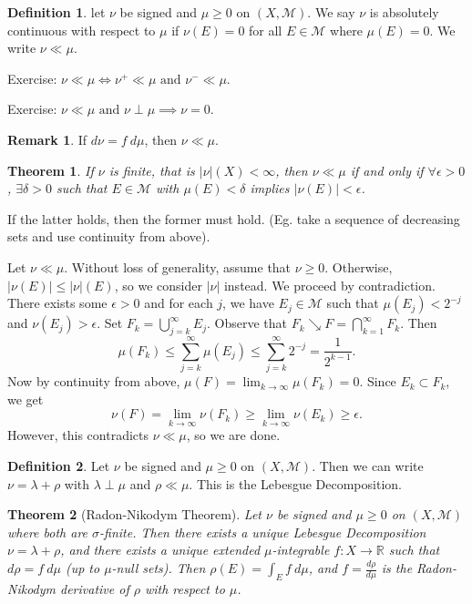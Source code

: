 \documentclass[11pt]{article}
\newtheorem{thm}{Theorem}[section]
\theoremstyle{definition}
\newtheorem{defn}{Definition}[section]
\newtheorem{remark}{Remark}[section]
\newcommand{\abs}[1]{\left\lvert#1\right\rvert} %
\newcommand{\RR}{\mathbb{R}}
\newcommand{\m}[1]{\mathcal{#1}}
\begin{document}
\begin{defn}
  let $\nu$ be signed and $\mu\ge0$ on $(X,\m{M})$. We say $\nu$ is absolutely continuous
  with respect to $\mu$ if $\nu(E)=0$ for all $E\in\m{M}$ where $\mu(E)=0$. We write
  $\nu\ll\mu$. 
\end{defn}

{\color{red}
Exercise: $\nu\ll\mu \iff \nu^+\ll\mu \text{ and } \nu^-\ll\mu$. 

Exercise: $\nu\ll\mu \text{ and } \nu\perp\mu \implies \nu=0$. 
}

\begin{remark}
  If $d\nu=f~d\mu$, then $\nu\ll\mu$. 
\end{remark}

\begin{thm}
  If $\nu$ is finite, that is $\abs{\nu}(X)<\infty$, then $\nu\ll\mu$ if and only if
  $\forall\epsilon>0$, $\exists\delta>0$ such that $E\in\m{M}$ with $\mu(E)<\delta$
  implies $\abs{\nu(E)}<\epsilon$.
\end{thm}

\proof
If the latter holds, then the former must hold. (Eg. take a sequence of decreasing sets and
use continuity from above). 

Let $\nu\ll\mu$. Without loss of generality, assume that $\nu\ge0$. Otherwise,
$\abs{\nu(E)}\le\abs{\nu}(E)$, so we consider $\abs{\nu}$ instead. We proceed by
contradiction. There exists some $\epsilon>0$ and for each $j$, we have $E_j\in\m{M}$ such
that $\mu(E_j)<2^{-j}$ and $\nu(E_j)>\epsilon$. Set $F_k=\bigcup_{j=k}^\infty E_j$.
Observe that $F_k\searrow F = \bigcap_{k=1}^\infty F_k$. Then 
\[
  \mu(F_k) \le \sum_{j=k}^\infty\mu(E_j) \le \sum_{j=k}^\infty2^{-j} = \frac1{2^{k-1}} . 
\]
Now by continuity from above, $\mu(F)=\lim_{k\to\infty}\mu(F_k)=0$. Since $E_k\subset
F_k$, we get 
\[
  \nu(F) = \lim_{k\to\infty}\nu(F_k) \ge \lim_{k\to\infty}\nu(E_k) \ge \epsilon .
\]
However, this contradicts $\nu\ll\mu$, so we are done. 
\qedhere


\begin{defn}
  Let $\nu$ be signed and $\mu\ge0$ on $(X,\m{M})$. Then we can write $\nu=\lambda+\rho$
  with $\lambda\perp\mu$ and $\rho\ll\mu$. This is the Lebesgue Decomposition. 
\end{defn}

\begin{thm}[Radon-Nikodym Theorem]
  Let $\nu$ be signed and $\mu\ge0$ on $(X,\m{M})$ where both are $\sigma$-finite. Then
  there exists a unique Lebesgue Decomposition $\nu=\lambda+\rho$, and there exists a
  unique extended $\mu$-integrable $f:X\to\RR$ such that $d\rho=f~d\mu$ (up to $\mu$-null
  sets). Then $\rho(E)=\int_Ef~d\mu$, and $f=\frac{d\rho}{d\mu}$ is the Radon-Nikodym
  derivative of $\rho$ with respect to $\mu$. 
\end{thm}
\end{document}
